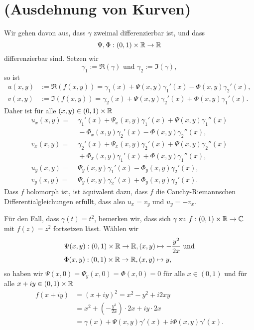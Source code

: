 \documentclass[a4paper,10pt]{article}
\begin{document}
\section{(Ausdehnung von Kurven)}
Wir gehen davon aus, dass $\gamma$ zweimal differenzierbar ist, und dass
\[
 \Psi, \Phi : (0,1) \times \mathbb{R} \to \mathbb{R}
\]
differenzierbar sind. Setzen wir
\[
 \gamma_1 := \Re(\gamma) \text{ und } \gamma_2 := \Im(\gamma),
\]
so ist
\begin{align*}
 u(x,y) &:= \Re(f(x,y)) = \gamma_1(x) + \Psi(x,y)\gamma_1'(x) - \Phi(x,y)\gamma_2'(x), \\
 v(x,y) &:= \Im(f(x,y)) = \gamma_2(x) + \Psi(x,y)\gamma_2'(x) + \Phi(x,y)\gamma_1'(x).
\end{align*}
Daher ist für alle $(x,y) \in (0,1) \times \mathbb{R}$
\begin{align*}
 u_x(x,y) =&\; \gamma_1'(x) + \Psi_x(x,y)\gamma_1'(x) + \Psi(x,y)\gamma_1''(x) \\
           &\; - \Phi_x(x,y)\gamma_2'(x) - \Phi(x,y)\gamma_2''(x), \\
 v_x(x,y) =&\; \gamma_2'(x) + \Psi_x(x,y)\gamma_2'(x) + \Psi(x,y)\gamma_2''(x) \\
           &\; + \Phi_x(x,y)\gamma_1'(x) + \Phi(x,y)\gamma_1''(x), \\
 u_y(x,y) =&\; \Psi_y(x,y)\gamma_1'(x) - \Phi_y(x,y)\gamma_2'(x), \\
 v_y(x,y) =&\; \Psi_y(x,y)\gamma_2'(x) + \Phi_y(x,y)\gamma_2'(x).
\end{align*}
Dass $f$ holomorph ist, ist äquivalent dazu, dass $f$ die Cauchy-Riemannschen Differentialgleichungen erfüllt, dass also $u_x = v_y$ und $u_y = -v_x$.

Für den Fall, dass $\gamma(t) = t^2$, bemerken wir, dass sich $\gamma$ zu $f : (0,1) \times \mathbb{R} \to \mathbb{C}$ mit $f(z) = z^2$ fortsetzen lässt. Wählen wir
\begin{align*}
 &\Psi(x,y) : (0,1) \times \mathbb{R} \to \mathbb{R}, (x,y) \mapsto -\frac{y^2}{2x} \text{ und}\\
 &\Phi(x,y) : (0,1) \times \mathbb{R} \to \mathbb{R}, (x,y) \mapsto y,
\end{align*}
so haben wir $\Psi(x,0) = \Psi_y(x,0) = \Phi(x,0) = 0$ für alle $x \in (0,1)$ und für alle $x+iy \in (0,1) \times \mathbb{R}$
\begin{align*}
 f(x+iy) &= (x+iy)^2 = x^2-y^2 + i2xy \\
         &= x^2 + \left(-\frac{y^2}{2x}\right) \cdot 2x + iy \cdot 2x \\
         &= \gamma(x) + \Psi(x,y)\gamma'(x) + i\Phi(x,y)\gamma'(x).
\end{align*}
\end{document}
